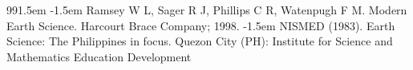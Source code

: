 \renewcommand{\bibname}{Cited References}
\def\bibindent{1.5em}
\begin{thebibliography}{99\kern\bibindent}
\makeatletter
\let\old@biblabel\@biblabel
\def\@biblabel#1{\old@biblabel{#1}\kern\bibindent}
\let\old@bibitem\bibitem
\def\bibitem#1{\old@bibitem{#1}\leavevmode\kern-\bibindent}
\renewcommand\@biblabel[1]{}
\setlength{\parskip}{0pt}
\setlength{\itemsep}{0pt plus 0.3ex}
\singlespacing
\makeatother
{} Ramsey W L, Sager R J, Phillips C R, Watenpugh F M. Modern Earth Science. Harcourt Brace Company; 1998.
 NISMED (1983). Earth Science: The Philippines in focus. Quezon City (PH): Institute for Science and Mathematics Education Development
\end{thebibliography}
